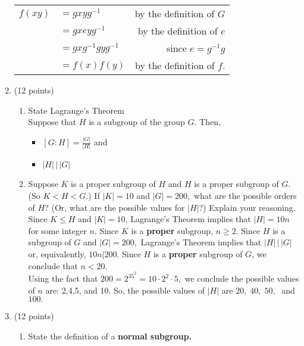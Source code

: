 \documentclass[12pt]{article}
\renewcommand{\emph}[1]{\textsf{\textbf{#1}}}
\begin{document}
\begin{enumerate}
\begin{tabular}{rlr}
$f(xy)$&$=gxyg^{-1}$& by the definition of $G$\\
&$=gxeyg^{-1}$ & by the definition of $e$\\
&$=gxg^{-1}gyg^{-1}$ & since $e=g^{-1}g$\\
&$=f(x)f(y)$& by the definition of $f$.
\end{tabular}


\newpage

\vfill

\item (12 points)
	\begin{enumerate}
	\item State Lagrange's Theorem\\
	
	Suppose that $H$ is a subgroup of the group $G.$ Then,\\
	
	\begin{itemize}
	\item $\displaystyle [G:H]=\frac{|G|}{|H|}$ and 
	\item $|H| \, \big \vert \, |G|$
	\end{itemize}
	\vfill
	\item Suppose $K$ is a proper subgroup of $H$ and $H$ is a proper subgroup of $G.$ (So $K<H<G.$) If $|K|=10$ and $|G|=200,$ what are the possible orders of $H$? (Or, what are the possible values for $|H|$?) Explain your reasoning.\\
	
	Since $K \leq H$ and $|K|=10$, Lagrange's Theorem implies that $|H|=10n$ for some integer $n.$ Since $K$ is a \emph{proper} subgroup, $n\geq 2.$ Since $H$ is a subgroup of $G$ and $|G|=200,$ Lagrange's Theorem implies that $|H| \, \big \vert \, |G|$ or, equivalently, $10n \big \vert 200.$ Since $H$ is a \emph{proper} subgroup of $G$, we conclude that $n < 20.$\\
	
	Using the fact that $200=2^35^2=10\cdot2^2\cdot 5,$ we conclude the possible values of $n$ are: 2,4,5, and 10. So, the possible values of $|H|$ are $20,\; 40,\; 50,\;$ and $100.$\\	
	\vfill
	\end{enumerate}
\item (12 points)
	\begin{enumerate}
	\item State the definition of a \emph{normal subgroup.}\\
	

\end{enumerate}
\end{enumerate}
\end{document}
